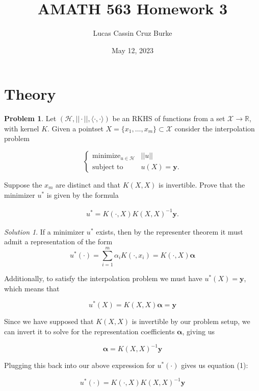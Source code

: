 \documentclass[12pt,a4paper]{article}
\title{AMATH 563 Homework 3}
\author{Lucas Cassin Cruz Burke}
\date{May 12, 2023}
\theoremstyle{definition}
\newtheorem{problem}{Problem}
\theoremstyle{remark}
\newtheorem*{solution}{Solution}
\begin{document}
\maketitle

\section{Theory}

\begin{problem}
    Let $(\mathcal H, ||\cdot||, \langle \cdot, \cdot \rangle)$ be an RKHS of functions from a set $\mathcal X \rightarrow \mathbb R$, with kernel $K$. Given a pointset $X = \{x_1, \dots, x_m \} \subset \mathcal X$ consider the interpolation problem 

    $$\begin{cases}
        \operatorname{minimize}_{u \in \mathcal H} & ||u|| \\
        \text{subject to} & u(X) = \mathbf y.
    \end{cases}$$

    Suppose the $x_m$ are distinct and that $K(X,X)$ is invertible. Prove that the minimizer $u^*$ is given by the formula

    \begin{align}
        u^* = K(\cdot, X)K(X,X)^{-1}\mathbf y.
    \end{align}
\end{problem}
\begin{solution}
    If a minimizer $u^*$ exists, then by the representer theorem it must admit a representation of the form $$u^*(\cdot) = \sum_{i=1}^m \alpha_i K(\cdot, x_i) = K(\cdot, X)\boldsymbol \alpha$$

    Additionally, to satisfy the interpolation problem we must have $u^*(X) = \mathbf y$, which means that 

    $$u^*(X) = K(X,X)\boldsymbol \alpha = \mathbf y$$

    Since we have supposed that $K(X,X)$ is invertible by our problem setup, we can invert it to solve for the representation coefficients $\boldsymbol \alpha$, giving us 

    $$\boldsymbol \alpha = K(X,X)^{-1} \mathbf y$$

    Plugging this back into our above expression for $u^*(\cdot)$ gives us equation (1):

    $$u^*(\cdot) = K(\cdot, X) K(X,X)^{-1} \mathbf y$$
\end{solution}
\end{document}
